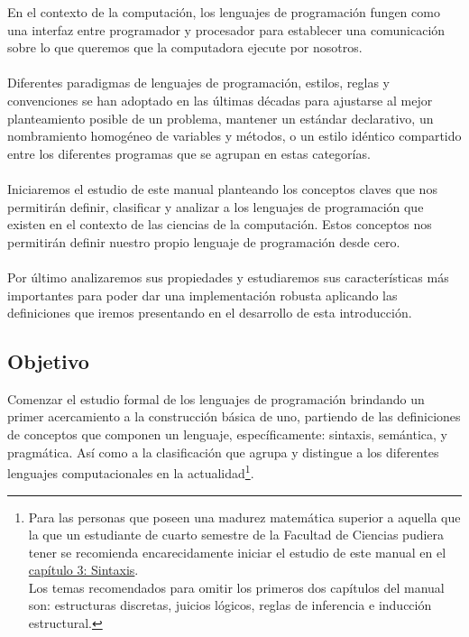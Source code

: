En el contexto de la computación, los lenguajes de programación fungen como una interfaz entre programador y procesador para establecer una comunicación sobre lo que queremos que la computadora ejecute por nosotros.\\\\
Diferentes paradigmas de lenguajes de programación, estilos, reglas y convenciones se han adoptado en las últimas décadas para ajustarse al mejor planteamiento posible de un problema, mantener un estándar declarativo, un nombramiento homogéneo de variables y métodos, o un estilo idéntico compartido entre los diferentes programas que se agrupan en estas categorías.\\\\
Iniciaremos el estudio de este manual planteando los conceptos claves que nos permitirán definir, clasificar y analizar a los lenguajes de programación que existen en el contexto de las ciencias de la computación. Estos conceptos nos permitirán definir nuestro propio lenguaje de programación desde cero.\\\\
Por último analizaremos sus propiedades y estudiaremos sus características más importantes para poder dar una implementación robusta aplicando las definiciones que iremos presentando en el desarrollo de esta introducción.\\

\subsection*{Objetivo}
    Comenzar el estudio formal de los lenguajes de programación brindando un primer acercamiento a la construcción básica de uno, partiendo de las definiciones de conceptos que componen un lenguaje, específicamente: sintaxis, semántica, y pragmática. Así como a la clasificación que agrupa y distingue a los diferentes lenguajes computacionales en la actualidad\footnote{Para las personas que poseen una madurez matemática superior a aquella que la que un estudiante de cuarto semestre de la Facultad de Ciencias pudiera tener se recomienda encarecidamente iniciar el estudio de este manual en el \hyperref[sec:sintax]{capítulo 3: Sintaxis}.\\ Los temas recomendados para omitir los primeros dos capítulos del manual son: estructuras discretas, juicios lógicos, reglas de inferencia e inducción estructural. }.

